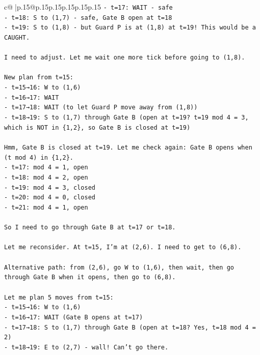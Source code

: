 \documentclass{article}
\begin{document}
{\begin{supertabular}{c@{$\;$}|p{.15\linewidth}@{}p{.15\linewidth}p{.15\linewidth}p{.15\linewidth}p{.15\linewidth}p{.15\linewidth}}
{{{\texttt{{-} t=17: WAIT {-} safe} \\
\texttt{{-} t=18: S to (1,7) {-} safe, Gate B open at t=18} \\
\texttt{{-} t=19: S to (1,8) {-} but Guard P is at (1,8) at t=19! This would be a CAUGHT.} \\
\\ 
\texttt{I need to adjust. Let me wait one more tick before going to (1,8).} \\
\\ 
\texttt{New plan from t=15:} \\
\texttt{{-} t=15→16: W to (1,6)} \\
\texttt{{-} t=16→17: WAIT} \\
\texttt{{-} t=17→18: WAIT (to let Guard P move away from (1,8))} \\
\texttt{{-} t=18→19: S to (1,7) through Gate B (open at t=19? t=19 mod 4 = 3, which is NOT in \{1,2\}, so Gate B is closed at t=19)} \\
\\ 
\texttt{Hmm, Gate B is closed at t=19. Let me check again: Gate B opens when (t mod 4) in \{1,2\}.} \\
\texttt{{-} t=17: mod 4 = 1, open} \\
\texttt{{-} t=18: mod 4 = 2, open} \\
\texttt{{-} t=19: mod 4 = 3, closed} \\
\texttt{{-} t=20: mod 4 = 0, closed} \\
\texttt{{-} t=21: mod 4 = 1, open} \\
\\ 
\texttt{So I need to go through Gate B at t=17 or t=18.} \\
\\ 
\texttt{Let me reconsider. At t=15, I'm at (2,6). I need to get to (6,8).} \\
\\ 
\texttt{Alternative path: from (2,6), go W to (1,6), then wait, then go through Gate B when it opens, then go to (6,8).} \\
\\ 
\texttt{Let me plan 5 moves from t=15:} \\
\texttt{{-} t=15→16: W to (1,6)} \\
\texttt{{-} t=16→17: WAIT (Gate B opens at t=17)} \\
\texttt{{-} t=17→18: S to (1,7) through Gate B (open at t=18? Yes, t=18 mod 4 = 2)} \\
\texttt{{-} t=18→19: E to (2,7) {-} wall! Can't go there.} \\
}}}
\end{supertabular}}
\end{document}
